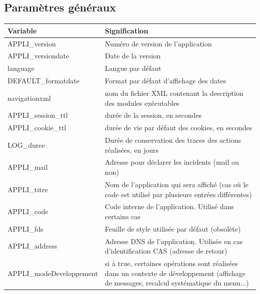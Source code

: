 \subsection{Paramètres généraux}
\begin{longtable}{|p{5cm}|p{8cm}|}
\hline
\textbf{Variable} & \textbf{Signification} \\
\hline
\endhead
\hline
\endfoot\endlastfoot
APPLI\_version & Numéro de version de l'application \\ 

APPLI\_versiondate & Date de la version \\ 

language & Langue par défaut \\

DEFAULT\_formatdate & Format par défaut d'affichage des dates\\

navigationxml & nom du fichier XML contenant la description des modules exécutables\\

APPLI\_session\_ttl & durée de la session, en secondes\\

APPLI\_cookie\_ttl & durée de vie par défaut des cookies, en secondes\\

LOG\_duree & Durée de conservation des traces des actions réalisées, en jours\\

APPLI\_mail & Adresse pour déclarer les incidents (mail ou non)\\

APPLI\_titre & Nom de l'application qui sera affiché (cas où le code est utilisé par plusieurs entrées différentes) \\

APPLI\_code & Code interne de l'application. Utilisé dans certains cas\\

APPLI\_fds & Feuille de style utilisée par défaut (obsolète)\\

APPLI\_address & Adresse DNS de l'application. Utilisée en cas d'identification CAS (adresse de retour)\\

APPLI\_modeDeveloppement & si à true, certaines opérations sont réalisées dans un contexte de développement (affichage de messages, recalcul systématique du menu...)\\


\end{longtable}
